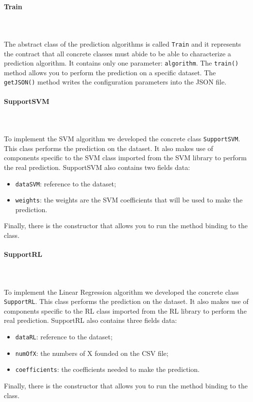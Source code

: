 \paragraph*{Train}\mbox{} \\ \mbox{} \\
The abstract class of the prediction algorithms is called \texttt{Train} and it
represents the contract that all concrete classes must abide to be able to characterize a prediction algorithm. It contains only one parameter: \texttt{algorithm}. The \texttt{train()} method allows you to perform the prediction on a specific dataset. The \texttt{getJSON()} method writes the configuration parameters into the JSON file.

\paragraph*{SupportSVM}\mbox{} \\ \mbox{} \\
To implement the SVM algorithm we developed the concrete class \texttt{SupportSVM}. This class performs the prediction on the dataset. 
It also makes use of components specific to the SVM class imported from the SVM library to perform the real prediction. SupportSVM also contains two fields data: \begin{itemize}
\item \texttt{dataSVM}: reference to the dataset;
\item \texttt{weights}: the weights are the SVM coefficients that will be used to make the prediction.
\end{itemize}
Finally, there is the constructor that allows you to run the method binding to the class.

\paragraph*{SupportRL}\mbox{} \\ \mbox{} \\
To implement the Linear Regression algorithm we developed the concrete class \texttt{SupportRL}. This class performs the prediction on the dataset. It also makes use of components specific to the RL class imported from the RL library to perform the real prediction. SupportRL also contains three fields data: \begin{itemize}
\item \texttt{dataRL}: reference to the dataset;
\item \texttt{numOfX}: the numbers of X founded on the CSV file;
\item \texttt{coefficients}: the coefficients needed to make the prediction.
\end{itemize}
Finally, there is the constructor that allows you to run the method binding to the class.

